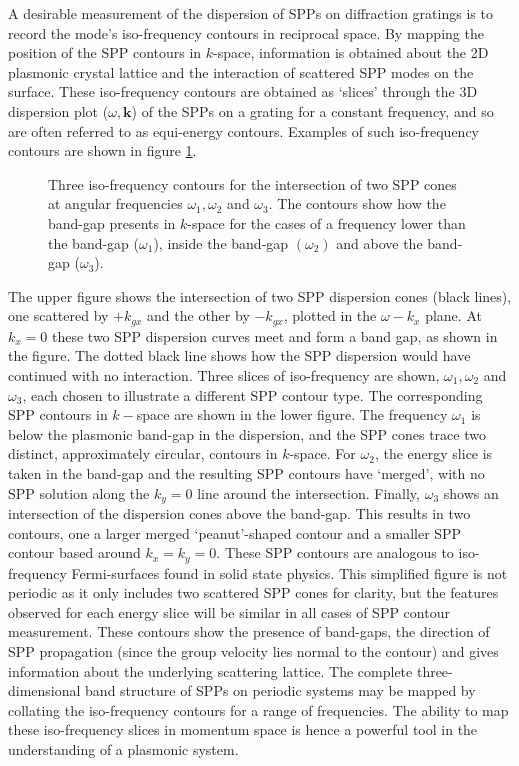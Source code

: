 A desirable measurement of the dispersion of SPPs on diffraction gratings is to record the mode's iso-frequency contours in reciprocal space. By mapping the position of the SPP contours in $k$-space, information is obtained about the 2D plasmonic crystal lattice and the interaction of scattered SPP modes on the surface. These iso-frequency contours are obtained as `slices' through the 3D dispersion plot ($\omega,\mathbf{k}$) of the SPPs on a grating for a constant frequency, and so are often referred to as equi-energy contours. Examples of such iso-frequency contours are shown in figure \ref{fig:equienergyslices}.
\begin{figure}
\begin{center}
\def\svgwidth{0.8\linewidth}

\end{center}
\caption[Three iso-frequency contours for the intersection of two SPP cones at angular frequencies $\omega_1,\omega_2$ and $\omega_3$.]{Three iso-frequency contours for the intersection of two SPP cones at angular frequencies $\omega_1,\omega_2$ and $\omega_3$. The contours show how the band-gap presents in $k$-space for the cases of a frequency lower than the band-gap ($\omega_1$), inside the band-gap $(\omega_2)$ and above the band-gap ($\omega_3$).\label{fig:equienergyslices}}
\end{figure}
The upper figure shows the intersection of two SPP dispersion cones (black lines), one scattered by $+k_{gx}$ and the other by $-k_{gx}$, plotted in the $\omega-k_x$ plane. At $k_x=0$ these two SPP dispersion curves meet and form a band gap, as shown in the figure. The dotted black line shows how the SPP dispersion would have continued with no interaction. 
Three slices of iso-frequency are shown, $\omega_1, \omega_2$ and $\omega_3$, each chosen to illustrate a different SPP contour type. The corresponding SPP contours in $k-$space are shown in the lower figure. The frequency $\omega_1$ is below the plasmonic band-gap in the dispersion, and the SPP cones trace two distinct,  approximately circular, contours in $k$-space. For $\omega_2$, the energy slice is taken in the band-gap and the resulting SPP contours have `merged', with no  SPP solution along the $k_y=0$ line around the intersection. Finally, $\omega_3$ shows an intersection of the dispersion cones above the band-gap. This results in two contours, one a larger merged `peanut'-shaped contour and a smaller SPP contour based around $k_x=k_y=0$. These SPP contours are analogous to iso-frequency Fermi-surfaces found in solid state physics. This simplified figure is not periodic as it only includes two scattered SPP cones for clarity, but the features observed for each energy slice will be similar in all cases of SPP contour measurement. 
These contours show the presence of band-gaps, the direction of SPP propagation (since the group velocity lies normal to the contour) and gives information about the underlying scattering lattice. The complete three-dimensional band structure of SPPs on periodic systems may be mapped by collating the iso-frequency contours for a range of frequencies. The ability to map these iso-frequency slices in momentum space is hence a powerful tool in the understanding of a plasmonic system.

